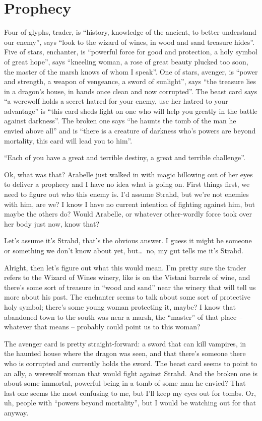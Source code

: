 \section*{Prophecy}
Four of glyphs, trader, is ``history, knowledge of the ancient, to better understand our enemy'', says ``look to the wizard of wines, in wood and sand treasure hides''. Five of stars, enchanter, is ``powerful force for good and protection, a holy symbol of great hope'', says ``kneeling woman, a rose of great beauty plucked too soon, the master of the marsh knows of whom I speak''. One of stars, avenger, is ``power and strength, a weapon of vengeance, a sword of sunlight'', says ``the treasure lies in a dragon's house, in hands once clean and now corrupted''. The beast card says ``a werewolf holds a secret hatred for your enemy, use her hatred to your advantage'' is ``this card sheds light on one who will help you greatly in the battle against darkness''. The broken one says ``he haunts the tomb of the man he envied above all'' and is ``there is a creature of darkness who's powers are beyond mortality, this card will lead you to him''.

``Each of you have a great and terrible destiny, a great and terrible challenge''.

Ok, what was that? Arabelle just walked in with magic billowing out of her eyes to deliver a prophecy and I have no idea what is going on. First things first, we need to figure out who this enemy is. I'd assume Strahd, but we're not enemies with him, are we? I know I have no current intention of fighting against him, but maybe the others do? Would Arabelle, or whatever other-wordly force took over her body just now, know that?

Let's assume it's Strahd, that's the obvious answer. I guess it might be someone or something we don't know about yet, but\dots\ no, my gut tells me it's Strahd.

Alright, then let's figure out what this would mean. I'm pretty sure the trader refers to the Wizard of Wines winery, like is on the Vistani barrels of wine, and there's some sort of treasure in ``wood and sand'' near the winery that will tell us more about his past. The enchanter seems to talk about some sort of protective holy symbol; there's some young woman protecting it, maybe? I know that abandoned town to the south was near a marsh, the ``master'' of that place -- whatever that means -- probably could point us to this woman?

The avenger card is pretty straight-forward: a sword that can kill vampires, in the haunted house where the dragon was seen, and that there's someone there who is corrupted and currently holds the sword. The beast card seems to point to an ally, a werewolf woman that would fight against Strahd. And the broken one is about some immortal, powerful being in a tomb of some man he envied? That last one seems the most confusing to me, but I'll keep my eyes out for tombs. Or, uh, people with ``powers beyond mortality'', but I would be watching out for that anyway.

